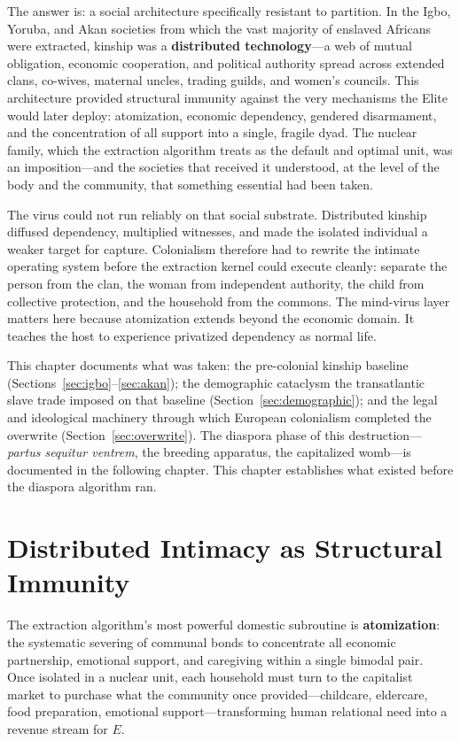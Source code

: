 The answer is: a social architecture specifically resistant to partition. In the Igbo, Yoruba, and Akan societies from which the vast majority of enslaved Africans were extracted, kinship was a \textbf{distributed technology}---a web of mutual obligation, economic cooperation, and political authority spread across extended clans, co-wives, maternal uncles, trading guilds, and women's councils. This architecture provided structural immunity against the very mechanisms the Elite would later deploy: atomization, economic dependency, gendered disarmament, and the concentration of all support into a single, fragile dyad. The nuclear family, which the extraction algorithm treats as the default and optimal unit, was an imposition---and the societies that received it understood, at the level of the body and the community, that something essential had been taken.

The virus could not run reliably on that social substrate. Distributed kinship diffused dependency, multiplied witnesses, and made the isolated individual a weaker target for capture. Colonialism therefore had to rewrite the intimate operating system before the extraction kernel could execute cleanly: separate the person from the clan, the woman from independent authority, the child from collective protection, and the household from the commons. The mind-virus layer matters here because atomization extends beyond the economic domain. It teaches the host to experience privatized dependency as normal life.

This chapter documents what was taken: the pre-colonial kinship baseline (Sections~\ref{sec:igbo}--\ref{sec:akan}); the demographic cataclysm the transatlantic slave trade imposed on that baseline (Section~\ref{sec:demographic}); and the legal and ideological machinery through which European colonialism completed the overwrite (Section~\ref{sec:overwrite}). The diaspora phase of this destruction---\textit{partus sequitur ventrem}, the breeding apparatus, the capitalized womb---is documented in the following chapter. This chapter establishes what existed before the diaspora algorithm ran.

\section{Distributed Intimacy as Structural Immunity}
\label{sec:distributed_intimacy}

The extraction algorithm's most powerful domestic subroutine is \textbf{atomization}: the systematic severing of communal bonds to concentrate all economic partnership, emotional support, and caregiving within a single bimodal pair. Once isolated in a nuclear unit, each household must turn to the capitalist market to purchase what the community once provided---childcare, eldercare, food preparation, emotional support---transforming human relational need into a revenue stream for $E$.

